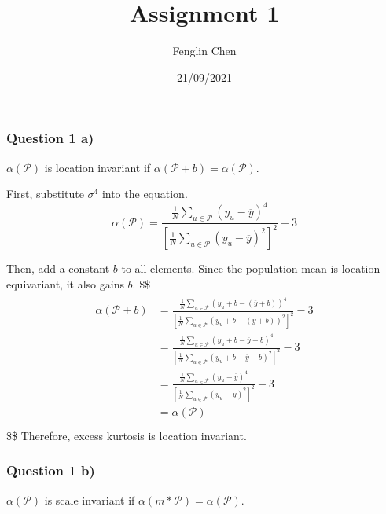 \documentclass[
]{article}
\title{Assignment 1}
\author{Fenglin Chen}
\date{21/09/2021}
\begin{document}
\maketitle

\hypertarget{question-1-a}{%
\subsubsection{Question 1 a)}\label{question-1-a}}

\(\alpha(\mathcal{P})\) is location invariant if
\(\alpha(\mathcal{P}+b) = \alpha(\mathcal{P})\).

First, substitute \(\sigma^4\) into the equation. \[
\alpha(\mathcal{P}) = \frac{\frac{1}{N} \sum_{u \in \mathcal{P}}\left( y_u -\overline{y} \right)^4}{ [\frac{1}{N}\sum_{u \in \mathcal{P}}(y_u-\overline y)^2]^2 }-3
\]

Then, add a constant \(b\) to all elements. Since the population mean is
location equivariant, it also gains \(b\). \$\$ \begin{align*}
\begin{split}
\alpha(\mathcal{P}+b) &= \frac{\frac{1}{N} \sum_{u \in \mathcal{P}}\left( y_u + b -(\overline{y} + b) \right)^4}{ [\frac{1}{N}\sum_{u \in \mathcal{P}}(y_u + b-(\overline y + b))^2]^2 }-3\\

&= \frac{\frac{1}{N} \sum_{u \in \mathcal{P}}\left( y_u + b -\overline{y} - b \right)^4}{ [\frac{1}{N}\sum_{u \in \mathcal{P}}(y_u + b-\overline y - b)^2]^2 }-3\\

&= \frac{\frac{1}{N} \sum_{u \in \mathcal{P}}\left( y_u -\overline{y} \right)^4}{ [\frac{1}{N}\sum_{u \in \mathcal{P}}(y_u -\overline y)^2]^2 }-3 \\

&= \alpha(\mathcal{P})\\

\end{split}
\end{align*} \$\$ Therefore, excess kurtosis is location invariant.

\newpage

\hypertarget{question-1-b}{%
\subsubsection{Question 1 b)}\label{question-1-b}}

\(\alpha(\mathcal{P})\) is scale invariant if
\(\alpha(m*\mathcal{P}) = \alpha(\mathcal{P})\).
\end{document}
